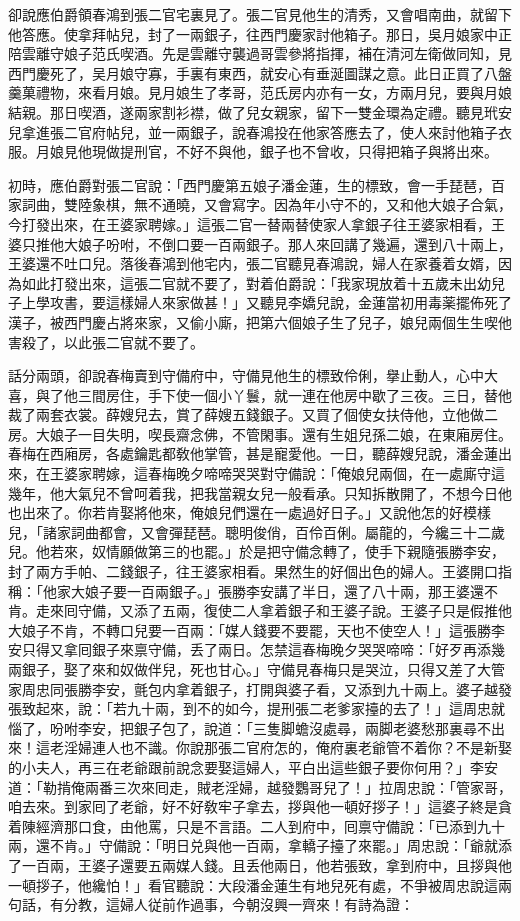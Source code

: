 卻說應伯爵領春鴻到張二官宅裏見了。張二官見他生的清秀，又會唱南曲，就留下他答應。使拿拜帖兒，封了一兩銀子，往西門慶家討他箱子。那日，吳月娘家中正陪雲離守娘子范氏喫酒。先是雲離守襲過哥雲參將指揮，補在清河左衛做同知，見西門慶死了，吴月娘守寡，手裏有東西，就安心有垂涎圖謀之意。此日正買了八盤羹菓禮物，來看月娘。見月娘生了孝哥，范氏房内亦有一女，方兩月兒，要與月娘結親。那日喫酒，遂兩家割衫襟，做了兒女親家，留下一雙金環為定禮。聽見玳安兒拿進張二官府帖兒，並一兩銀子，說春鴻投在他家答應去了，使人來討他箱子衣服。月娘見他現做提刑官，不好不與他，銀子也不曾收，只得把箱子與將出來。

初時，應伯爵對張二官說：「西門慶第五娘子潘金蓮，生的標致，會一手琵琶，百家詞曲，雙陸象棋，無不通曉，又會寫字。因為年小守不的，又和他大娘子合氣，今打發出來，在王婆家聘嫁。」這張二官一替兩替使家人拿銀子往王婆家相看，王婆只推他大娘子吩咐，不倒口要一百兩銀子。那人來回講了幾遍，還到八十兩上，王婆還不吐口兒。落後春鴻到他宅内，張二官聽見春鴻說，婦人在家養着女婿，因為如此打發出來，這張二官就不要了，對着伯爵說：「我家現放着十五歲未出幼兒子上學攻書，要這樣婦人來家做甚！」又聽見李嬌兒說，金蓮當初用毒薬擺佈死了漢子，被西門慶占將來家，又偷小廝，把第六個娘子生了兒子，娘兒兩個生生喫他害殺了，以此張二官就不要了。

話分兩頭，卻說春梅賣到守備府中，守備見他生的標致伶俐，擧止動人，心中大喜，與了他三間房住，手下使一個小丫鬟，就一連在他房中歇了三夜。三日，替他裁了兩套衣裳。薛嫂兒去，賞了薛嫂五錢銀子。又買了個使女扶侍他，立他做二房。大娘子一目失明，喫長齋念佛，不管閑事。還有生姐兒孫二娘，在東廂房住。春梅在西廂房，各處鑰匙都敎他掌管，甚是寵愛他。一日，聽薛嫂兒說，潘金蓮出來，在王婆家聘嫁，這春梅晚夕啼啼哭哭對守備說：「俺娘兒兩個，在一處廝守這幾年，他大氣兒不曾呵着我，把我當親女兒一般看承。只知拆散開了，不想今日他也出來了。你若肯娶將他來，俺娘兒們還在一處過好日子。」又說他怎的好模樣兒，「諸家詞曲都會，又會彈琵琶。聰明俊俏，百伶百俐。屬龍的，今纔三十二歲兒。他若來，奴情願做第三的也罷。」於是把守備念轉了，使手下親隨張勝李安，封了兩方手帕、二錢銀子，往王婆家相看。果然生的好個出色的婦人。王婆開口指稱：「他家大娘子要一百兩銀子。」張勝李安講了半日，還了八十兩，那王婆還不肯。走來囘守備，又添了五兩，復使二人拿着銀子和王婆子說。王婆子只是假推他大娘子不肯，不轉口兒要一百兩：「媒人錢要不要罷，天也不使空人！」這張勝李安只得又拿囘銀子來禀守備，丢了兩日。怎禁這春梅晚夕哭哭啼啼：「好歹再添幾兩銀子，娶了來和奴做伴兒，死也甘心。」守備見春梅只是哭泣，只得又差了大管家周忠同張勝李安，氈包内拿着銀子，打開與婆子看，又添到九十兩上。婆子越發張致起來，說：「若九十兩，到不的如今，提刑張二老爹家擡的去了！」這周忠就惱了，吩咐李安，把銀子包了，說道：「三隻脚蟾沒處尋，兩脚老婆愁那裏尋不出來！這老淫婦連人也不識。你說那張二官府怎的，俺府裏老爺管不着你？不是新娶的小夫人，再三在老爺跟前說念要娶這婦人，平白出這些銀子要你何用？」李安道：「勒掯俺兩番三次來囘走，賊老淫婦，越發鸚哥兒了！」拉周忠說：「管家哥，咱去來。到家囘了老爺，好不好敎牢子拿去，拶與他一頓好拶子！」這婆子終是貪着陳經濟那口食，由他罵，只是不言語。二人到府中，囘禀守備說：「已添到九十兩，還不肯。」守備說：「明日兑與他一百兩，拿轎子擡了來罷。」周忠說：「爺就添了一百兩，王婆子還要五兩媒人錢。且丢他兩日，他若張致，拿到府中，且拶與他一頓拶子，他纔怕！」看官聽說：大段潘金蓮生有地兒死有處，不爭被周忠說這兩句話，有分教，這婦人従前作過事，今朝沒興一齊來！有詩為證：

